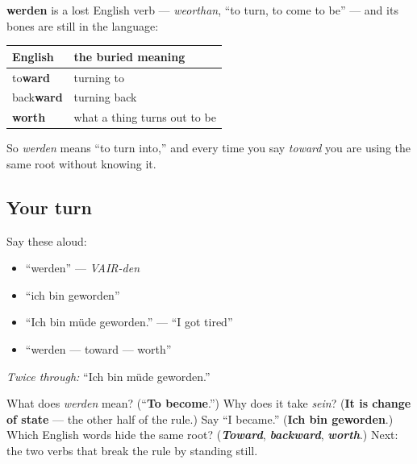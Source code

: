 \begin{cousinweb}
\textbf{werden} is a lost English verb — \emph{weorthan}, \textquotedblleft{}to turn, to come to be\textquotedblright{} — and its bones are still in the language:

\noindent
\begin{tabularx}{\linewidth}{@{}>{\raggedright\arraybackslash}X>{\raggedright\arraybackslash}X@{}}
\toprule
\textbf{English} & \textbf{the buried meaning} \\
\midrule
to\textbf{ward} & turning to \\
back\textbf{ward} & turning back \\
\textbf{worth} & what a thing turns out to be \\
\bottomrule
\end{tabularx}

So \emph{werden} means \textquotedblleft{}to turn into,\textquotedblright{} and every time you say \emph{toward} you are using the same root without knowing it.
\end{cousinweb}

\subsection*{Your turn}
Say these aloud:

\begin{itemize}
\raggedright
  \item \textquotedblleft{}werden\textquotedblright{} — \emph{VAIR-den}
  \item \textquotedblleft{}ich bin geworden\textquotedblright{}
  \item \textquotedblleft{}Ich bin müde geworden.\textquotedblright{} — \textquotedblleft{}I got tired\textquotedblright{}
  \item \textquotedblleft{}werden — toward — worth\textquotedblright{}
\end{itemize}

\emph{Twice through:} \textquotedblleft{}Ich bin müde geworden.\textquotedblright{}

\begin{tcolorbox}[breakable,colback=teal!4,colframe=teal!35!black,title={Before you move on}]
What does \emph{werden} mean? (\textquotedblleft{}\textbf{To become}.\textquotedblright{}) Why does it take \emph{sein}? (\textbf{It is change of state} — the other half of the rule.) Say \textquotedblleft{}I became.\textquotedblright{} (\textbf{Ich bin geworden}.) Which English words hide the same root? (\emph{\textbf{Toward}}, \emph{\textbf{backward}}, \emph{\textbf{worth}}.) Next: the two verbs that break the rule by standing still.
\end{tcolorbox}

